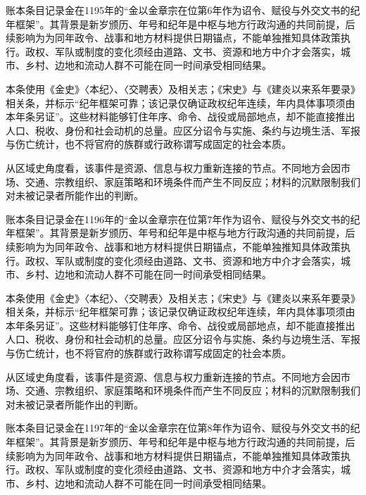 账本条目记录金在1195年的“金以金章宗在位第6年作为诏令、赋役与外交文书的纪年框架”。其背景是新岁颁历、年号和纪年是中枢与地方行政沟通的共同前提，后续影响为为同年政令、战事和地方材料提供日期锚点，不能单独推知具体政策执行。政权、军队或制度的变化须经由道路、文书、资源和地方中介才会落实，城市、乡村、边地和流动人群不可能在同一时间承受相同结果。

本条使用《金史》〈本纪〉、〈交聘表〉及相关志；《宋史》与《建炎以来系年要录》相关条，并标示“纪年框架可靠；该记录仅确证政权纪年连续，年内具体事项须由本年条另证”。这些材料能够钉住年序、命令、战役或局部地点，却不能直接推出人口、税收、身份和社会动机的总量。应区分诏令与实施、条约与边境生活、军报与伤亡统计，也不将官府的族群或行政称谓写成固定的社会本质。

从区域史角度看，该事件是资源、信息与权力重新连接的节点。不同地方会因市场、交通、宗教组织、家庭策略和环境条件而产生不同反应；材料的沉默限制我们对未被记录者所能作出的判断。

账本条目记录金在1196年的“金以金章宗在位第7年作为诏令、赋役与外交文书的纪年框架”。其背景是新岁颁历、年号和纪年是中枢与地方行政沟通的共同前提，后续影响为为同年政令、战事和地方材料提供日期锚点，不能单独推知具体政策执行。政权、军队或制度的变化须经由道路、文书、资源和地方中介才会落实，城市、乡村、边地和流动人群不可能在同一时间承受相同结果。

本条使用《金史》〈本纪〉、〈交聘表〉及相关志；《宋史》与《建炎以来系年要录》相关条，并标示“纪年框架可靠；该记录仅确证政权纪年连续，年内具体事项须由本年条另证”。这些材料能够钉住年序、命令、战役或局部地点，却不能直接推出人口、税收、身份和社会动机的总量。应区分诏令与实施、条约与边境生活、军报与伤亡统计，也不将官府的族群或行政称谓写成固定的社会本质。

从区域史角度看，该事件是资源、信息与权力重新连接的节点。不同地方会因市场、交通、宗教组织、家庭策略和环境条件而产生不同反应；材料的沉默限制我们对未被记录者所能作出的判断。

账本条目记录金在1197年的“金以金章宗在位第8年作为诏令、赋役与外交文书的纪年框架”。其背景是新岁颁历、年号和纪年是中枢与地方行政沟通的共同前提，后续影响为为同年政令、战事和地方材料提供日期锚点，不能单独推知具体政策执行。政权、军队或制度的变化须经由道路、文书、资源和地方中介才会落实，城市、乡村、边地和流动人群不可能在同一时间承受相同结果。


